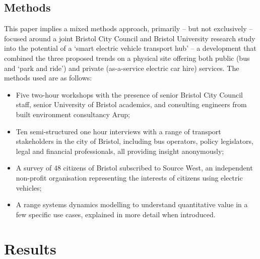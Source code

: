 \documentclass[journal]{IEEEtran}
\begin{document}
\subsection{Methods}

This paper implies a mixed methods approach, primarily – but not
exclusively -- focused around a joint Bristol City Council and Bristol
University research study into the potential of a `smart electric
vehicle transport hub' -- a development that combined the three
proposed trends on a physical site offering both public (bus and `park
and ride') and private (as-a-service electric car hire) services. The
methods used are as follows:

\begin{itemize}
\item Five two-hour workshops with the presence of senior Bristol City
Council staff, senior University of Bristol academics, and consulting
engineers from built environment consultancy Arup;
\item Ten semi-structured one hour interviews with a range of
transport stakeholders in the city of Bristol, including bus
operators, policy legislators, legal and financial professionals, all
providing insight anonymously;
\item A survey of 48 citizens of Bristol subscribed to Source West, an
independent non-profit organisation representing the interests of
citizens using electric vehicles;
\item A range systems dynamics modelling to understand quantitative
value in a few specific use cases, explained in more detail when
introduced.
\end{itemize}


\section{Results}


\end{document}
